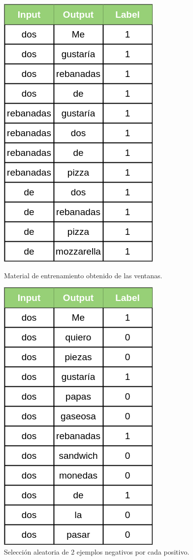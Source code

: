 \begin{figure}
    \centering
    \begin{minipage}[b]{0.4\textwidth}
      \includegraphics[scale=0.5]{figures/context_example_2.png}
      \caption{Material de entrenamiento obtenido de las ventanas.}
    \end{minipage}
    \hfill
    \begin{minipage}[b]{0.4\textwidth}
      \includegraphics[scale=0.5]{figures/context_example_3.png}
      \caption{Selección aleatoria de 2 ejemplos negativos por cada positivo.}
    \end{minipage}
\end{figure}

